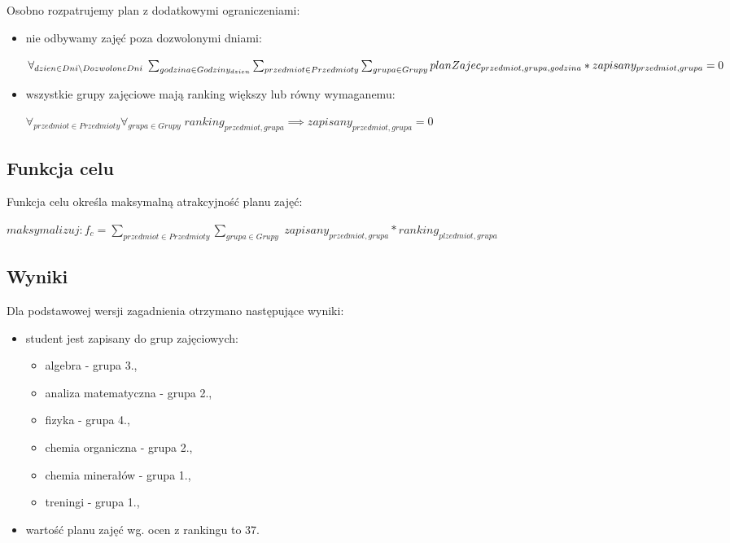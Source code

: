 \documentclass[polish,12pt,titlepage]{article}
\begin{document}
Osobno rozpatrujemy plan z dodatkowymi ograniczeniami:
\begin{itemize}
    \item nie odbywamy zajęć poza dozwolonymi dniami:
    \begin{center}
    $\forall_{dzien \in Dni \setminus DozwoloneDni} \; \sum_{godzina \in Godziny_{dzien}} \sum_{przedmiot \in Przedmioty} \sum_{grupa \in Grupy} \linebreak
    planZajec_{przedmiot,grupa,godzina} * zapisany_{przedmiot,grupa} = 0$
    \end{center}
    
    \item wszystkie grupy zajęciowe mają ranking większy lub równy wymaganemu:
    \begin{center}
    $\forall_{przedmiot \in Przedmioty} \forall_{grupa \in Grupy} \; ranking_{przedmiot,grupa} \implies zapisany_{przedmiot,grupa} = 0$
    \end{center}
\end{itemize}

\subsection{Funkcja celu}

Funkcja celu określa maksymalną atrakcyjność planu zajęć:

\begin{center}
$maksymalizuj: f_{c} = \sum_{przedmiot \in Przedmioty} \sum_{grupa \in Grupy} \; zapisany_{przedmiot,grupa} * ranking_{plzedmiot,grupa}$
\end{center}

\subsection{Wyniki}

Dla podstawowej wersji zagadnienia otrzymano następujące wyniki:
\begin{itemize}
    \item student jest zapisany do grup zajęciowych:
    \begin{itemize}
        \item algebra - grupa 3.,
        \item analiza matematyczna - grupa 2.,
        \item fizyka - grupa 4.,
        \item chemia organiczna - grupa 2.,
        \item chemia minerałów - grupa 1.,
        \item treningi - grupa 1.,
    \end{itemize}
    \item wartość planu zajęć wg. ocen z rankingu to $37$.
\end{itemize}
\end{document}
